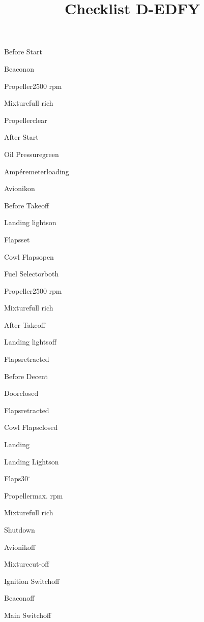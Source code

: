 \def\papersize{6}




\title{Checklist D-EDFY}

\begin{checklist}{Before Start}
  \item{Beacon}{on}
  \item{Propeller}{2500 rpm}
  \item{Mixture}{full rich}
  \item{Propeller}{clear}
\end{checklist}

\begin{checklist}{After Start}
  \item{Oil Pressure}{green}
  \item{Ampéremeter}{loading}
  \item{Avionik}{on}
\end{checklist}

\begin{checklist}{Before Takeoff}
  \item{Landing lights}{on}
  \item{Flaps}{set}
  \item{Cowl Flaps}{open}
  \item{Fuel Selector}{both}
  \item{Propeller}{2500 rpm}
  \item{Mixture}{full rich}
\end{checklist}

\begin{checklist}{After Takeoff}
  \item{Landing lights}{off}
  \item{Flaps}{retracted}
\end{checklist}

\begin{checklist}{Before Decent}
  \item{Door}{closed}
  \item{Flaps}{retracted}
  \item{Cowl Flaps}{closed}
\end{checklist}

\begin{checklist}{Landing}
  \item{Landing Lights}{on}
  \item{Flaps}{30$^{\circ}$}
  \item{Propeller}{max. rpm}
  \item{Mixture}{full rich}
\end{checklist}

\begin{checklist}{Shutdown}
  \item{Avionik}{off}
  \item{Mixture}{cut-off}
  \item{Ignition Switch}{off}
  \item{Beacon}{off}
  \item{Main Switch}{off}
\end{checklist}

